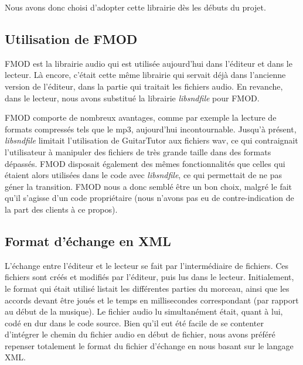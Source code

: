 \documentclass[a4paper,11pt]{article}
\begin{document}
Nous avons donc choisi d'adopter cette librairie dès les débuts du projet.

\subsection{Utilisation de FMOD}

FMOD est la librairie audio qui est utilisée aujourd'hui dans l'éditeur et dans le lecteur. Là encore, c'était cette même librairie qui servait déjà dans l'ancienne version de l'éditeur, dans la partie qui traitait les fichiers audio. En revanche, dans le lecteur, nous avons substitué la librairie \textit{libsndfile} pour FMOD.

FMOD comporte de nombreux avantages, comme par exemple la lecture de formats compressés tels que le mp3, aujourd'hui incontournable. Jusqu'à présent, \textit{libsndfile} limitait l'utilisation de GuitarTutor aux fichiers wav, ce qui contraignait l'utilisateur à manipuler des fichiers de très grande taille dans des formats dépassés. FMOD disposait également des mêmes fonctionnalités que celles qui étaient alors utilisées dans le code avec \textit{libsndfile}, ce qui permettait de ne pas géner la transition. FMOD nous a donc semblé être un bon choix, malgré le fait qu'il s'agisse d'un code propriétaire (nous n'avons pas eu de contre-indication de la part des clients à ce propos).

\subsection{Format d'échange en XML}
\label{xml}

L'échange entre l'éditeur et le lecteur se fait par l'intermédiaire de fichiers. Ces fichiers sont créés et modifiés par l'éditeur, puis lus dans le lecteur. Initialement, le format qui était utilisé listait les différentes parties du morceau, ainsi que les accords devant être joués et le temps en millisecondes correspondant (par rapport au début de la musique). Le fichier audio lu simultanément était, quant à lui, codé en dur dans le code source. Bien qu'il eut été facile de se contenter d'intégrer le chemin du fichier audio en début de fichier, nous avons préféré repenser totalement le format du fichier d'échange en nous basant sur le langage XML.
\end{document}
